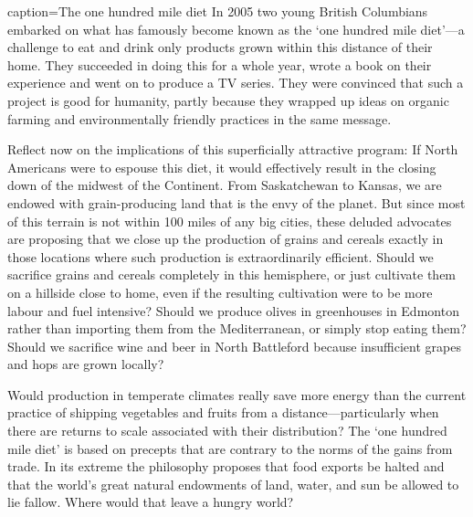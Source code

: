 \newhtmlpage

\begin{ApplicationBox}{caption={The one hundred mile diet\label{app:ch15app1}}}
	In 2005 two young British Columbians embarked on what has famously become known as the `one hundred mile diet'---a challenge to eat and drink only products grown within this distance of their home. They succeeded in doing this for a whole year, wrote a book on their experience and went on to produce a TV series. They were convinced that such a project is good for humanity, partly because they wrapped up ideas on organic farming and environmentally friendly practices in the same message.

	Reflect now on the implications of this superficially attractive program: If North Americans were to espouse this diet, it would effectively result in the closing down of the midwest of the Continent. From Saskatchewan to Kansas, we are endowed with grain-producing land that is the envy of the planet. But since most of this terrain is not within 100 miles of any big cities, these deluded advocates are proposing that we close up the production of grains and cereals exactly in those locations where such production is extraordinarily efficient. Should we sacrifice grains and cereals completely in this hemisphere, or just cultivate them on a hillside close to home, even if the resulting cultivation were to be more labour and fuel intensive? Should we produce olives in greenhouses in Edmonton rather than importing them from the Mediterranean, or simply stop eating them? Should we sacrifice wine and beer in North Battleford because insufficient grapes and hops are grown locally?

	Would production in temperate climates really save more energy than the current practice of shipping vegetables and fruits from a distance---particularly when there are returns to scale associated with their distribution? The `one hundred mile diet' is based on precepts that are contrary to the norms of the gains from trade. In its extreme the philosophy proposes that food exports be halted and that the world's great natural endowments of land, water, and sun be allowed to lie fallow. Where would that leave a hungry world? 
\end{ApplicationBox}
